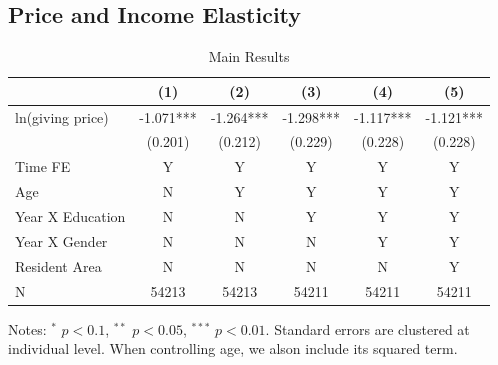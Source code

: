 \documentclass[ review  , 3p ]{elsarticle}
\begin{document}
  \hypertarget{price-and-income-elasticity}{%
  \subsection{Price and Income Elasticity}\label{price-and-income-elasticity}}
  
  \begin{table}
  
  \caption{\label{tab:kableEstimateElasticityPart1}Main Results}
  \centering
  \begin{threeparttable}
  \begin{tabular}[t]{lccccc}
  \toprule
   & (1) & (2) & (3) & (4) & (5)\\
  \midrule
  ln(giving price) & -1.071*** & -1.264*** & -1.298*** & -1.117*** & -1.121***\\
   & (0.201) & (0.212) & (0.229) & (0.228) & (0.228)\\
  Time FE & Y & Y & Y & Y & Y\\
  Age & N & Y & Y & Y & Y\\
  Year X Education & N & N & Y & Y & Y\\
  Year X Gender & N & N & N & Y & Y\\
  Resident Area & N & N & N & N & Y\\
  N & 54213 & 54213 & 54211 & 54211 & 54211\\
  \bottomrule
  \end{tabular}
  \begin{tablenotes}
  \item Notes: $^{*}$ $p < 0.1$, $^{**}$ $p < 0.05$, $^{***}$ $p < 0.01$. Standard errors are clustered at individual level. When controlling age, we alson include its squared term.
  \end{tablenotes}
  \end{threeparttable}
  \end{table}
  
\end{document}
